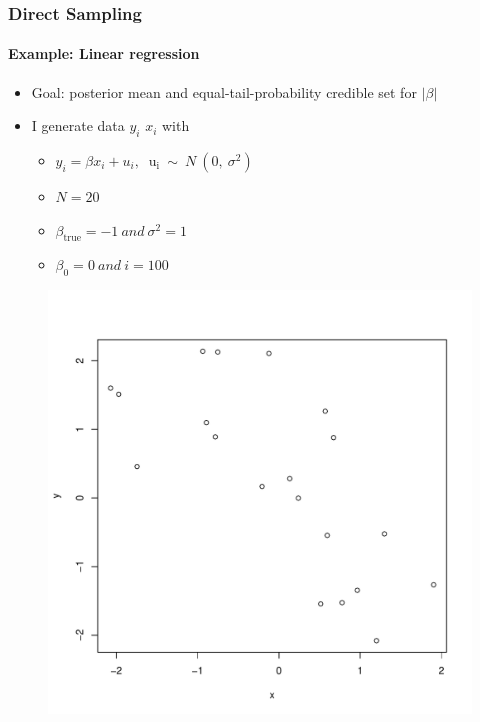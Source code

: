 \documentclass[
  shownotes,
  xcolor={svgnames},
  hyperref={colorlinks,citecolor=DarkBlue,linkcolor=DarkRed,urlcolor=DarkBlue}
  , aspectratio=169]{beamer}
\begin{document}
\begin{frame}[fragile]
\frametitle{Direct Sampling}
\framesubtitle{Example: Linear regression}

\begin{itemize}
\item Goal: posterior mean and equal-tail-probability credible set for $|\beta|$
\medskip


\item I generate data $y_{i}$ $x_{i}$ with
\begin{itemize}
\item $ y_{i} = \beta x_{i} + u_{i},\ \text{\ \ u}_{\text{i\ }}\sim\ N\ (0,\ \sigma^{2})$

\item $N = 20$

\item $\beta_{\text{true}} = - 1\ and\ \sigma^{2} = 1$

\item $\beta_{0} = 0\ and\ i = 100$
\end{itemize}
\end{itemize}

\begin{figure}[H] \centering
  \centering
  \includegraphics[scale=0.25]{figures/scatter}
  \\
  \tiny 
\end{figure}
\end{frame}
\end{document}
